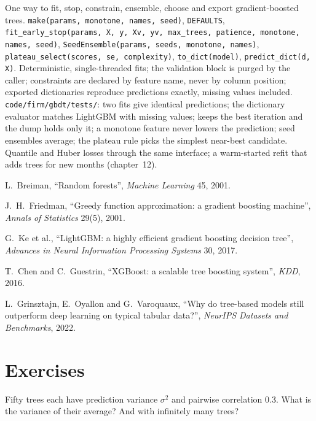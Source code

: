 \begin{build}
 One way to fit, stop, constrain, ensemble, choose and export gradient-boosted trees.
 \texttt{make(params, monotone, names, seed)}, \texttt{DEFAULTS}, \texttt{fit\_early\_stop(params,
X, y, Xv, yv, max\_trees, patience, monotone, names, seed)}, \texttt{SeedEnsemble(params, seeds, monotone, names)},
\texttt{plateau\_select(scores, se, complexity)}, \texttt{to\_dict(model)}, \texttt{predict\_dict(d, X)}.
 Deterministic, single-threaded fits; the validation block is purged by the caller; constraints are
declared by feature name, never by column position; exported dictionaries reproduce predictions exactly, missing values
included.
 \texttt{code/firm/gbdt/tests/}: two fits give identical predictions; the dictionary evaluator
matches LightGBM with missing values;  keeps the best iteration and the dump holds only it; a monotone
feature never lowers the prediction; seed ensembles average; the plateau rule picks the simplest near-best candidate.
 Quantile and Huber losses through the same interface; a warm-started refit that adds trees for new
months (chapter~12).
\end{build}

\begin{omsources}
\item L.~Breiman, ``Random forests'', \emph{Machine Learning} 45, 2001.
\item J.~H.~Friedman, ``Greedy function approximation: a gradient boosting machine'', \emph{Annals of Statistics} 29(5),
2001.
\item G.~Ke et al., ``LightGBM: a highly efficient gradient boosting decision tree'', \emph{Advances in Neural Information
Processing Systems} 30, 2017.
\item T.~Chen and C.~Guestrin, ``XGBoost: a scalable tree boosting system'', \emph{KDD}, 2016.
\item L.~Grinsztajn, E.~Oyallon and G.~Varoquaux, ``Why do tree-based models still outperform deep learning on typical
tabular data?'', \emph{NeurIPS Datasets and Benchmarks}, 2022.
\end{omsources}

\section{Exercises}

\begin{exercise}[$\star$]\label{exo:ml:trees-and-boosting:1}
Fifty trees each have prediction variance $\sigma^2$ and pairwise correlation 0.3. What is the variance of their
average? And with infinitely many trees?
\end{exercise}


